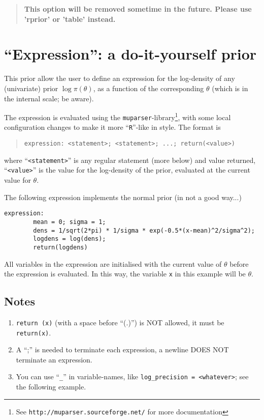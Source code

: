 \documentclass[a4paper,11pt]{article}
\begin{document}
\begin{quote}
    \textbf{\Large This option will be removed sometime in the future.
        Please use 'rprior' or 'table' instead.}
\end{quote}
\clearpage

\section*{``Expression'': a do-it-yourself prior}

This prior allow the user to define an expression for the log-density
of any (univariate) prior $\log\pi(\theta)$, as a function of the
corresponding $\theta$ (which is in the internal scale; be aware).

The expression is evaluated using the
\texttt{muparser}-library\footnote{See
    \texttt{http://muparser.sourceforge.net/} for more documentation},
with some local configuration changes to make it more
``\texttt{R}''-like in style. The format is
\begin{quote}
    \texttt{expression: <statement>; <statement>; ...; return(<value>)}
\end{quote}
where ``\texttt{<statement>}'' is any regular statement (more below)
and value returned, ``\texttt{<value>}'' is the value for the
log-density of the prior, evaluated at the current value for $\theta$.

The following expression implements the normal prior (in not a good
way...)
\begin{verbatim}
expression:
        mean = 0; sigma = 1;
        dens = 1/sqrt(2*pi) * 1/sigma * exp(-0.5*(x-mean)^2/sigma^2);
        logdens = log(dens);
        return(logdens)
\end{verbatim}
All variables in the expression are initialised with the current value
of $\theta$ before the expression is evaluated. In this way, the
variable \verb|x| in this example will be $\theta$.

\subsection*{Notes}
\begin{enumerate}
\item \verb|return (x)| (with a space before ``(.)'') is NOT allowed,
    it must be \verb|return(x)|.
\item A ``;'' is needed to terminate each expression, a newline DOES
    NOT terminate an expression.
\item You can use ``\verb|_|'' in variable-names, like
    \verb|log_precision = <whatever>|; see the following example.
\end{enumerate}
\end{document}
